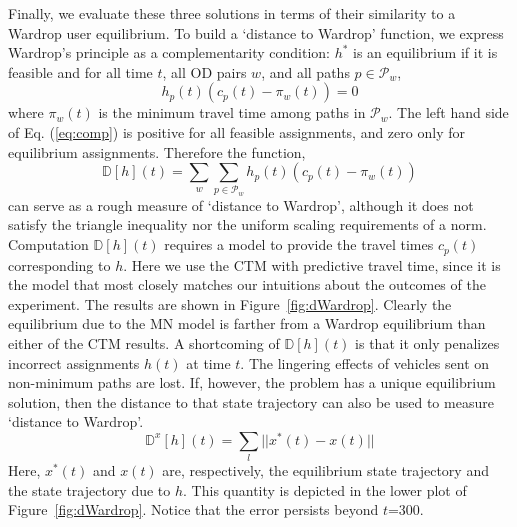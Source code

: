 Finally, we evaluate these three solutions in terms of their similarity to a Wardrop user equilibrium. To build a `distance to Wardrop' function, we express Wardrop's principle as a complementarity condition: $h^*$ is an equilibrium  if it is feasible and for all time $t$, all OD pairs $w$, and all paths $p\in\mathcal{P}_w$,
\begin{equation}
\label{eq:comp}
h_p(t)\left(c_p(t)-\pi_w(t)\right) = 0
\end{equation}
where $\pi_w(t)$ is the minimum travel time among paths in $\mathcal{P}_w$. The left hand side of Eq. (\ref{eq:comp}) is positive for all feasible assignments, and zero only for equilibrium assignments. Therefore the function,
\begin{equation}
\mathbb{D}[h](t) =\sum_w \sum_{p\in\mathcal{P}_w} h_p(t)\left(c_p(t)-\pi_w(t)\right)
\end{equation}
can serve as a rough measure of `distance to Wardrop', although it does not satisfy the triangle inequality nor the uniform scaling requirements of a norm. Computation $\mathbb{D}[h](t)$ requires a model to provide the travel times $c_p(t)$ corresponding to $h$. Here we use the CTM with predictive travel time, since it is the model that most closely matches our intuitions about the outcomes of the experiment. The results are shown in Figure~\ref{fig:dWardrop}. Clearly the equilibrium due to the MN model is farther from a Wardrop equilibrium than either of the CTM results. A shortcoming of $\mathbb{D}[h](t)$ is that it only penalizes incorrect assignments $h(t)$ at time $t$. The lingering effects of vehicles sent on non-minimum paths are lost. If, however, the problem has a unique equilibrium solution, then the distance to that state trajectory can also be used to measure `distance to Wardrop'.
\begin{equation}
\mathbb{D}^x[h](t) = \sum_{l} ||x^{*}(t)-x(t)||
\end{equation}
Here, $x^{*}(t)$ and $x(t)$ are, respectively, the equilibrium state trajectory and the state trajectory due to $h$. This quantity is depicted in the lower plot of Figure~\ref{fig:dWardrop}. Notice that the error persists beyond $t$=300.